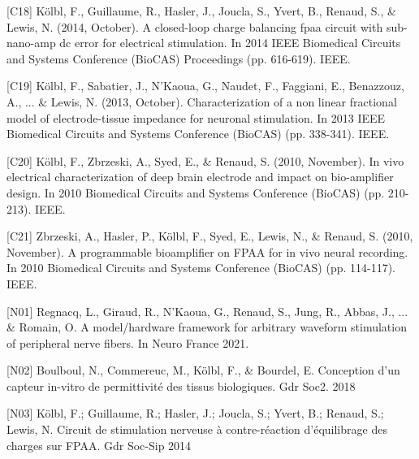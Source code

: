 \begin{cvskills}
  \cvskill
    {[C18]} %
    {Kölbl, F., Guillaume, R., Hasler, J., Joucla, S., Yvert, B., Renaud, S., \& Lewis, N. (2014, October). A closed-loop charge balancing fpaa circuit with sub-nano-amp dc error for electrical stimulation. In 2014 IEEE Biomedical Circuits and Systems Conference (BioCAS) Proceedings (pp. 616-619). IEEE.} %
\end{cvskills}  
\begin{cvskills}
  \cvskill
    {[C19]} %
    {Kölbl, F., Sabatier, J., N'Kaoua, G., Naudet, F., Faggiani, E., Benazzouz, A., ... \& Lewis, N. (2013, October). Characterization of a non linear fractional model of electrode-tissue impedance for neuronal stimulation. In 2013 IEEE Biomedical Circuits and Systems Conference (BioCAS) (pp. 338-341). IEEE.} %
\end{cvskills}  
\begin{cvskills}    
  \cvskill
    {[C20]} %
    {Kölbl, F., Zbrzeski, A., Syed, E., \& Renaud, S. (2010, November). In vivo electrical characterization of deep brain electrode and impact on bio-amplifier design. In 2010 Biomedical Circuits and Systems Conference (BioCAS) (pp. 210-213). IEEE.} %
\end{cvskills}  
\begin{cvskills}   
  \cvskill
    {[C21]} %
    {Zbrzeski, A., Hasler, P., Kölbl, F., Syed, E., Lewis, N., \& Renaud, S. (2010, November). A programmable bioamplifier on FPAA for in vivo neural recording. In 2010 Biomedical Circuits and Systems Conference (BioCAS) (pp. 114-117). IEEE.} %
\end{cvskills}

\begin{cvskills}   
  \cvskill
    {[N01]} %
    {Regnacq, L., Giraud, R., N'Kaoua, G., Renaud, S., Jung, R., Abbas, J., ... \& Romain, O. A model/hardware framework for arbitrary waveform stimulation of peripheral nerve fibers. In Neuro France 2021. } %
\end{cvskills}
\begin{cvskills}   
  \cvskill
    {[N02]} %
    {Boulboul, N., Commereuc, M., Kölbl, F., \& Bourdel, E. Conception d’un capteur in-vitro de permittivité des tissus biologiques. Gdr Soc2. 2018} %
\end{cvskills}
\begin{cvskills}   
  \cvskill
    {[N03]} %
    {Kölbl, F.; Guillaume, R.; Hasler, J.; Joucla, S.; Yvert, B.; Renaud, S.; Lewis, N. Circuit de stimulation nerveuse à contre-réaction d’équilibrage des charges sur FPAA. Gdr Soc-Sip 2014} %
\end{cvskills}

